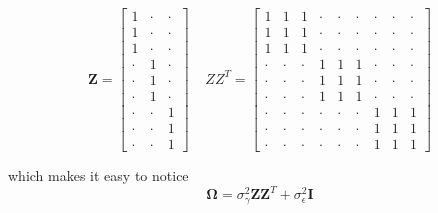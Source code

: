 \documentclass[]{book}
\theoremstyle{definition}
\theoremstyle{definition}
\theoremstyle{remark}
\begin{document}
\[\boldsymbol{Z}=\left[\begin{array}{ccc}
1 & \cdot & \cdot\\
1 & \cdot & \cdot\\
1 & \cdot & \cdot\\
\cdot & 1 & \cdot\\
\cdot & 1 & \cdot\\
\cdot & 1 & \cdot\\
\cdot & \cdot & 1\\
\cdot & \cdot & 1\\
\cdot & \cdot & 1
\end{array}\right]\;\;\;\;ZZ^{T}=\left[\begin{array}{ccccccccc}
1 & 1 & 1 & \cdot & \cdot & \cdot & \cdot & \cdot & \cdot\\
1 & 1 & 1 & \cdot & \cdot & \cdot & \cdot & \cdot & \cdot\\
1 & 1 & 1 & \cdot & \cdot & \cdot & \cdot & \cdot & \cdot\\
\cdot & \cdot & \cdot & 1 & 1 & 1 & \cdot & \cdot & \cdot\\
\cdot & \cdot & \cdot & 1 & 1 & 1 & \cdot & \cdot & \cdot\\
\cdot & \cdot & \cdot & 1 & 1 & 1 & \cdot & \cdot & \cdot\\
\cdot & \cdot & \cdot & \cdot & \cdot & \cdot & 1 & 1 & 1\\
\cdot & \cdot & \cdot & \cdot & \cdot & \cdot & 1 & 1 & 1\\
\cdot & \cdot & \cdot & \cdot & \cdot & \cdot & 1 & 1 & 1
\end{array}\right]\]

which makes it easy to notice
\[\boldsymbol{\Omega}=\sigma_{\gamma}^{2}\boldsymbol{Z}\boldsymbol{Z}^{T}+\sigma_{\epsilon}^{2}\boldsymbol{I}\]
\end{document}
